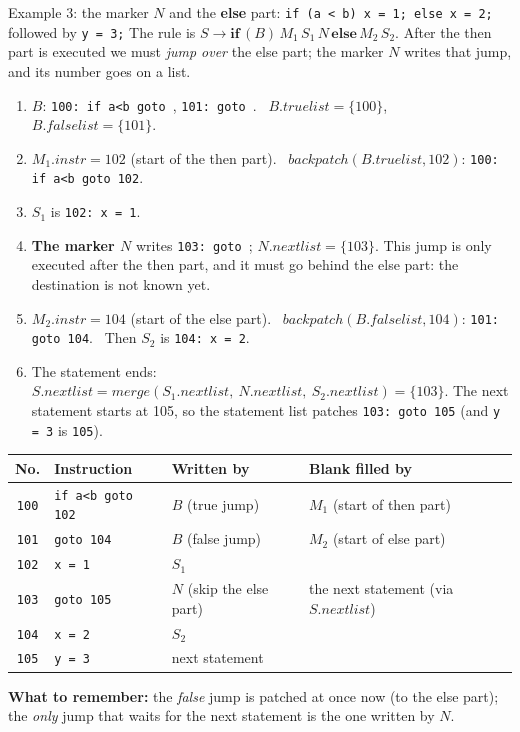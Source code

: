 \documentclass[11pt,a4paper]{article}
\begin{document}
\begin{examplebox}{Example 3: the marker $N$ and the \textbf{else} part: \texttt{if (a < b) x = 1; else x = 2;} followed by \texttt{y = 3;}}
The rule is $S\to\mathbf{if}\,(B)\,M_1\,S_1\,N\,\mathbf{else}\,M_2\,S_2$. After the then part is executed we must \emph{jump over} the else part; the marker $N$ writes that jump, and its number goes on a list.
\begin{enumerate}[nosep]
\item $B$: \texttt{100: if a<b goto \blk}, \texttt{101: goto \blk}. \ $B.truelist=\{100\}$, $B.falselist=\{101\}$.
\item $M_1.instr=102$ (start of the then part). \ $\mathit{backpatch}(B.truelist,102)$: \texttt{100: if a<b goto 102}.
\item $S_1$ is \texttt{102: x = 1}.
\item \textbf{The marker $N$} writes \texttt{103: goto \blk}; $N.nextlist=\{103\}$. This jump is only executed after the then part, and it must go behind the else part: the destination is not known yet.
\item $M_2.instr=104$ (start of the else part). \ $\mathit{backpatch}(B.falselist,104)$: \texttt{101: goto 104}. \ Then $S_2$ is \texttt{104: x = 2}.
\item The statement ends: $S.nextlist=\mathit{merge}(S_1.nextlist,\ N.nextlist,\ S_2.nextlist)=\{103\}$. The next statement starts at 105, so the statement list patches \texttt{103: goto 105} (and \texttt{y = 3} is \texttt{105}).
\end{enumerate}
\begin{center}
\small
\begin{tabular}{@{}c l l l@{}}
\toprule
\textbf{No.} & \textbf{Instruction} & \textbf{Written by} & \textbf{Blank filled by} \\ \midrule
\texttt{100} & \texttt{if a<b goto 102} & $B$ (true jump)  & $M_1$ (start of then part) \\
\texttt{101} & \texttt{goto 104}        & $B$ (false jump) & $M_2$ (start of else part) \\
\texttt{102} & \texttt{x = 1}           & $S_1$ & \\
\texttt{103} & \texttt{goto 105}        & $N$ (skip the else part) & the next statement (via $S.nextlist$) \\
\texttt{104} & \texttt{x = 2}           & $S_2$ & \\
\texttt{105} & \texttt{y = 3}           & next statement & \\ \bottomrule
\end{tabular}
\end{center}
\textbf{What to remember:} the \emph{false} jump is patched at once now (to the else part); the \emph{only} jump that waits for the next statement is the one written by $N$.
\end{examplebox}
\end{document}
